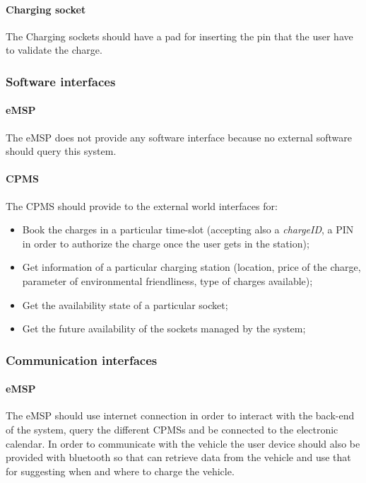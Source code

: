 \paragraph{Charging socket}
The Charging sockets should have a pad for inserting the pin that the user have to validate the charge.


\subsubsection{Software interfaces}
\paragraph{\ac{eMSP}}
The \ac{eMSP} does not provide any software interface because no external software should query this system.


\paragraph{\ac{CPMS}}
The \ac{CPMS} should provide to the external world interfaces for:
\begin{itemize}
    \item Book the charges in a particular time-slot (accepting also a \textit{chargeID}, a PIN in order to authorize the charge once the user gets in the station);
    \item Get information of a particular charging station (location, price of the charge, parameter of environmental friendliness, type of charges available);
    \item Get the availability state of a particular socket;
    \item Get the future availability of the sockets managed by the system;
\end{itemize}


\subsubsection{Communication interfaces}
\paragraph{\ac{eMSP}}
The \ac{eMSP} should use internet connection in order to interact with the back-end of the system, query the different \acp{CPMS} and be connected to the electronic calendar. In order to communicate with the vehicle the user device should also be provided with bluetooth so that can retrieve data from the vehicle and use that for suggesting when and where to charge the vehicle.

